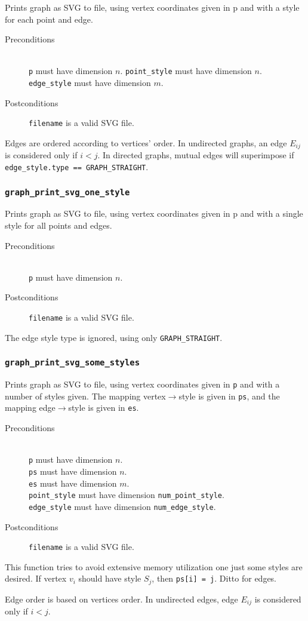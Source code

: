 Prints graph as SVG to file, using vertex coordinates given in p and with a 
style for each point and edge.

\begin{description}
 \item[Preconditions]~\\
   \texttt{p} must have dimension $n$.
   \texttt{point\_style} must have dimension $n$.
   \texttt{edge\_style} must have dimension $m$.
 \item[Postconditions]
   \texttt{filename} is a valid SVG file.
\end{description}

Edges are ordered according to vertices' order. In undirected graphs, 
an edge $E_{ij}$ is considered only if $i < j$. In directed graphs,
mutual edges will superimpose if \texttt{edge\_style.type == GRAPH\_STRAIGHT}.

\subsubsection{\texttt{graph\_print\_svg\_one\_style}}

Prints graph as SVG to file, using vertex coordinates given in p and with a 
single style for all points and edges.

\begin{description}
 \item[Preconditions]~\\
   \texttt{p} must have dimension $n$.
 \item[Postconditions]
   \texttt{filename} is a valid SVG file.
\end{description}

The edge style type is ignored, using only \texttt{GRAPH\_STRAIGHT}.

\subsubsection{\texttt{graph\_print\_svg\_some\_styles}}

Prints graph as SVG to file, using vertex coordinates given in \texttt{p} and
with a number of styles given. The mapping vertex$\to$style is given in \texttt{ps},
and the mapping edge$\to$style is given in \texttt{es}.

\begin{description}
 \item[Preconditions]~\\
   \texttt{p} must have dimension $n$.\\
   \texttt{ps} must have dimension $n$.\\
   \texttt{es} must have dimension $m$.\\
   \texttt{point\_style} must have dimension \texttt{num\_point\_style}.\\
   \texttt{edge\_style} must have dimension \texttt{num\_edge\_style}.
 \item[Postconditions]
   \texttt{filename} is a valid SVG file.
\end{description}

This function tries to avoid extensive memory utilization one just some 
styles are desired. If vertex $v_i$ should have style $S_j$, then 
\texttt{ps[i] = j}. Ditto for edges.

Edge order is based on vertices order. In undirected edges, edge $E_{ij}$ 
is considered only if $i < j$.
